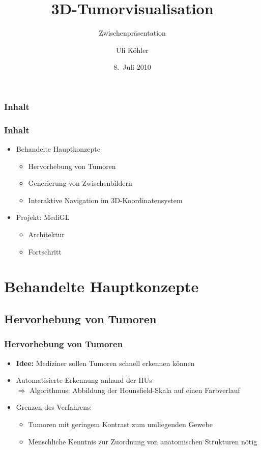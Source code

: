 \documentclass[14pt]{beamer}
\title{3D-Tumorvisualisation}
\subtitle{Zwischenpräsentation}
\author{Uli Köhler}
\institute[EMG]{Ernst-Mach-Gymnasium Haar}
\date{8.~Juli 2010}
\begin{document}
\frame{\titlepage}
\begin{frame}
\frametitle{Inhalt}
\tableofcontents
\end{frame}
\begin{frame}
   \frametitle{Inhalt}
   \begin{itemize}
    \item  Behandelte Hauptkonzepte
    \begin{itemize}
      \item Hervorhebung von Tumoren
      \item Generierung von Zwischenbildern
      \item Interaktive Navigation im 3D-Koordinatensystem
    \end{itemize}
    \pause
    \item Projekt: MediGL
    \begin{itemize}
     \item Architektur
     \item Fortschritt
    \end{itemize}
   \end{itemize}
\end{frame}
 \section{Behandelte Hauptkonzepte}
\subsection{Hervorhebung von Tumoren}
\begin{frame}[allowframebreaks]
 \frametitle{Hervorhebung von Tumoren}
    \begin{itemize}
     \item \textbf{Idee:} Mediziner sollen Tumoren schnell erkennen können
     \item Automatisierte Erkennung anhand der HUs\\
	  $\Rightarrow$ Algorithmus: Abbildung der Hounsfield-Skala auf einen Farbverlauf
     \item Grenzen des Verfahrens:
      \begin{itemize}
	\item Tumoren mit geringem Kontrast zum umliegenden Gewebe
	\item Menschliche Kenntnis zur Zuordnung von anatomischen Strukturen nötig
      \end{itemize}
    \end{itemize}
\end{frame}
\end{document}

